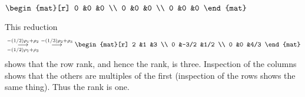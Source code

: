 \begin{exercises}
\begin{exparts*}
      \partsitem \(
        \begin{mat}[r]
          0  &0  &0  \\
          0  &0  &0  \\
          0  &0  &0
        \end{mat}  \)
    \end{exparts*}
    \begin{answer}
      \begin{exparts}
         \partsitem This reduction
           \begin{equation*}
             \mbox{}
             \grstep[-(1/2)\rho_1+\rho_3]{-(1/2)\rho_1+\rho_2}
             \;\grstep{-(1/3)\rho_2+\rho_3}
             \begin{mat}[r]
               2  &1     &3     \\
               0  &-3/2  &1/2   \\
               0  &0     &4/3
             \end{mat}
           \end{equation*}
           shows that the row rank, and hence the rank, is three.
         \partsitem Inspection of the columns shows that the others
           are multiples of the first (inspection of the rows shows the same
           thing).
           Thus the rank is one.
           

\end{exparts}
\end{answer}
\end{exercises}
